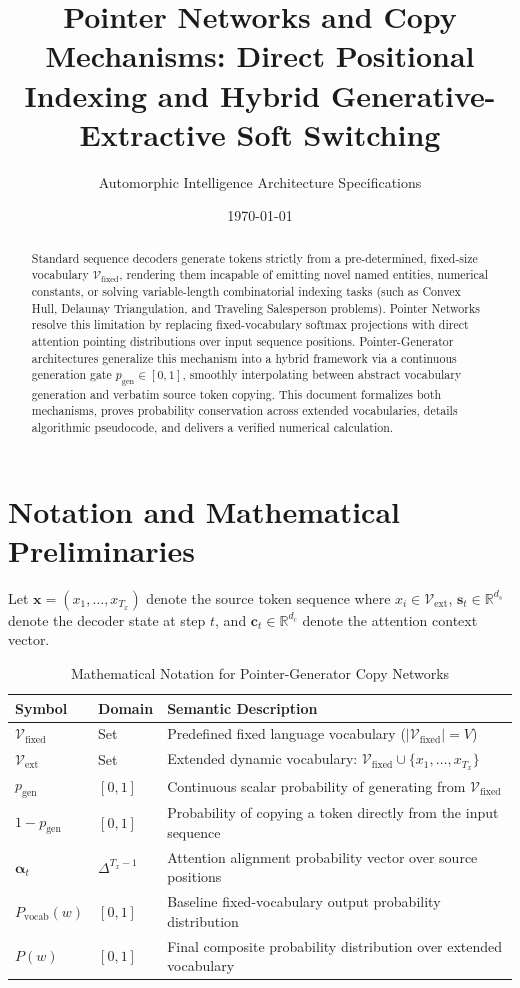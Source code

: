 \documentclass[11pt,a4paper]{article}
\title{Pointer Networks and Copy Mechanisms: Direct Positional Indexing and Hybrid Generative-Extractive Soft Switching}
\author{Automorphic Intelligence Architecture Specifications}
\date{\today}
\theoremstyle{definition}
\begin{document}
\maketitle

\begin{abstract}
Standard sequence decoders generate tokens strictly from a pre-determined, fixed-size vocabulary $\mathcal{V}_{\text{fixed}}$, rendering them incapable of emitting novel named entities, numerical constants, or solving variable-length combinatorial indexing tasks (such as Convex Hull, Delaunay Triangulation, and Traveling Salesperson problems). Pointer Networks resolve this limitation by replacing fixed-vocabulary softmax projections with direct attention pointing distributions over input sequence positions. Pointer-Generator architectures generalize this mechanism into a hybrid framework via a continuous generation gate $p_{\text{gen}} \in [0, 1]$, smoothly interpolating between abstract vocabulary generation and verbatim source token copying. This document formalizes both mechanisms, proves probability conservation across extended vocabularies, details algorithmic pseudocode, and delivers a verified numerical calculation.
\end{abstract}

\section{Notation and Mathematical Preliminaries}

Let $\mathbf{x} = (x_1, \dots, x_{T_x})$ denote the source token sequence where $x_i \in \mathcal{V}_{\text{ext}}$, $\mathbf{s}_t \in \mathbb{R}^{d_s}$ denote the decoder state at step $t$, and $\mathbf{c}_t \in \mathbb{R}^{d_c}$ denote the attention context vector.

\begin{table}[h]
\centering
\caption{Mathematical Notation for Pointer-Generator Copy Networks}
\begin{tabular}{lll}
\toprule
\textbf{Symbol} & \textbf{Domain} & \textbf{Semantic Description} \\
\midrule
$\mathcal{V}_{\text{fixed}}$ & Set & Predefined fixed language vocabulary ($|\mathcal{V}_{\text{fixed}}| = V$) \\
$\mathcal{V}_{\text{ext}}$ & Set & Extended dynamic vocabulary: $\mathcal{V}_{\text{fixed}} \cup \{x_1, \dots, x_{T_x}\}$ \\
$p_{\text{gen}}$ & $[0, 1]$ & Continuous scalar probability of generating from $\mathcal{V}_{\text{fixed}}$ \\
$1 - p_{\text{gen}}$ & $[0, 1]$ & Probability of copying a token directly from the input sequence \\
$\boldsymbol{\alpha}_t$ & $\Delta^{T_x - 1}$ & Attention alignment probability vector over source positions \\
$P_{\text{vocab}}(w)$ & $[0, 1]$ & Baseline fixed-vocabulary output probability distribution \\
$P(w)$ & $[0, 1]$ & Final composite probability distribution over extended vocabulary \\
\bottomrule
\end{tabular}
\end{table}
\end{document}
